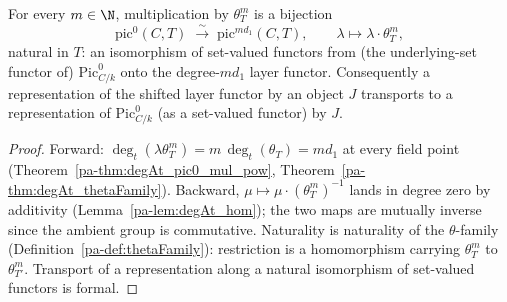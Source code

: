 \begin{theorem}
  \label{pa-thm:mulThetaPowNatIso}
  \leanok

  For every \(m \in \N\), multiplication by \(\theta_T^{m}\) is a bijection
  \[
    \mathrm{pic}^0(C,T) \;\xrightarrow{\ \sim\ }\; \mathrm{pic}^{m d_1}(C,T),
    \qquad \lambda \mapsto \lambda \cdot \theta_T^{m},
  \]
  natural in \(T\): an isomorphism of set-valued functors from (the underlying-set functor
  of) \(\mathrm{Pic}^0_{C/k}\) onto the degree-\(m d_1\) layer functor. Consequently a
  representation of the shifted layer functor by an object \(J\) transports to a
  representation of \(\mathrm{Pic}^0_{C/k}\) (as a set-valued functor) by \(J\).
\end{theorem}
\begin{proof}
  \leanok
  Forward: \(\deg_t(\lambda\theta_T^m) = m\,\deg_t(\theta_T) = m d_1\) at every field point
  (Theorem~\ref{pa-thm:degAt_pic0_mul_pow}, Theorem~\ref{pa-thm:degAt_thetaFamily}). Backward,
  \(\mu \mapsto \mu \cdot (\theta_T^{m})^{-1}\) lands in degree zero by additivity
  (Lemma~\ref{pa-lem:degAt_hom}); the two maps are mutually inverse since the ambient group is
  commutative. Naturality is naturality of the \(\theta\)-family
  (Definition~\ref{pa-def:thetaFamily}): restriction is a homomorphism carrying
  \(\theta_T^{m}\) to \(\theta_{T'}^{m}\). Transport of a representation along a natural
  isomorphism of set-valued functors is formal.
\end{proof}

